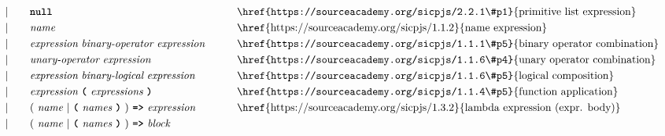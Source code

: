 \begin{alignat*}{9}
&&                       && |   &\quad && \textbf{\texttt{null}}
                                                           && \textrm{\href{https://sourceacademy.org/sicpjs/2.2.1\#p1}{primitive list expression}} \\
&&                       && |   &\quad &&  \textit{name}   && \textrm{\href{https://sourceacademy.org/sicpjs/1.1.2}{name expression}}\\
&&                       && |   &\quad &&  \textit{expression} \  \textit{binary-operator} \ 
                                            \textit{expression} \qquad
                                                           && \textrm{\href{https://sourceacademy.org/sicpjs/1.1.1\#p5}{binary operator combination}}\\
&&                       && |   &\quad &&   \textit{unary-operator} \ 
                                            \textit{expression}
                                                           && \textrm{\href{https://sourceacademy.org/sicpjs/1.1.6\#p4}{unary operator combination}}\\
&&                       && |   &\quad &&  \textit{expression} \  \textit{binary-logical} \ 
                                            \textit{expression} \qquad
                                                           && \textrm{\href{https://sourceacademy.org/sicpjs/1.1.6\#p5}{logical composition}}\\
&&                       && |   &\quad &&   \textit{expression} \ 
                                            \textbf{\texttt{(}}\ \textit{expressions}\
                                            \textbf{\texttt{)}}
                                                           && \textrm{\href{https://sourceacademy.org/sicpjs/1.1.4\#p5}{function application}}\\
&&                       && |   &\quad &&   (\ \textit{name}\ | \
                                               \textbf{\texttt{(}}\ \textit{names}\ \textbf{\texttt{)}}\
                                            )\    
                                            \texttt{\textbf{=>}}\ \textit{expression}
                                                           && \textrm{\href{https://sourceacademy.org/sicpjs/1.3.2}{lambda expression (expr. body)}}\\
&&                       && |   &\quad &&   (\ \textit{name}\ | \
                                               \textbf{\texttt{(}}\ \textit{names}\ \textbf{\texttt{)}}\
                                            )\    
                                            \texttt{\textbf{=>}}\ \textit{block}

\end{alignat*}
